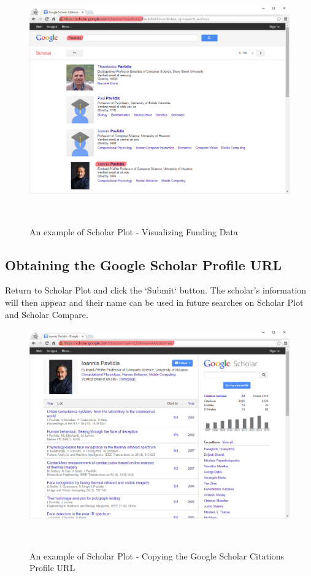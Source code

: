 \begin{figure}
  \centering
  \includegraphics[width=1\textwidth]{figures/Support-1}
  \caption{An example of Scholar Plot - Visualizing Funding Data}~\label{fig:Support-1}
\end{figure}




\subsection{Obtaining the Google Scholar Profile URL}
Return to Scholar Plot and click the `Submit` button. The scholar's information will then appear and their name can be used in future searches on Scholar Plot and Scholar Compare.

\begin{figure}
  \centering
  \includegraphics[width=1\textwidth]{figures/Support-2}
  \caption{An example of Scholar Plot - Copying the Google Scholar Citations Profile URL}~\label{fig:Support-2}
\end{figure}

